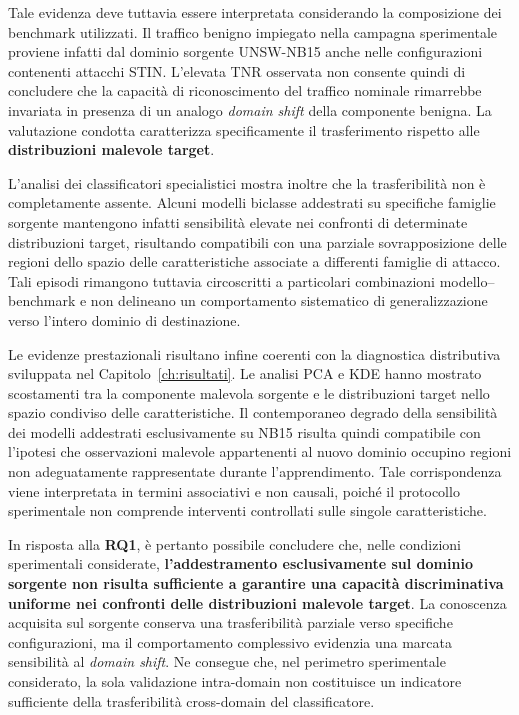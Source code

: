 Tale evidenza deve tuttavia essere interpretata considerando la composizione dei benchmark utilizzati.
Il traffico benigno impiegato nella campagna sperimentale proviene infatti dal dominio sorgente UNSW-NB15 anche nelle configurazioni contenenti attacchi STIN.
L'elevata TNR osservata non consente quindi di concludere che la capacità di riconoscimento del traffico nominale rimarrebbe invariata in presenza di un analogo \textit{domain shift} della componente benigna.
La valutazione condotta caratterizza specificamente il trasferimento rispetto alle \textbf{distribuzioni malevole target}.

L'analisi dei classificatori specialistici mostra inoltre che la trasferibilità non è completamente assente.
Alcuni modelli biclasse addestrati su specifiche famiglie sorgente mantengono infatti sensibilità elevate nei confronti di determinate distribuzioni target, risultando compatibili con una parziale sovrapposizione delle regioni dello spazio delle caratteristiche associate a differenti famiglie di attacco.
Tali episodi rimangono tuttavia circoscritti a particolari combinazioni modello--benchmark e non delineano un comportamento sistematico di generalizzazione verso l'intero dominio di destinazione.

Le evidenze prestazionali risultano infine coerenti con la diagnostica distributiva sviluppata nel Capitolo~\ref{ch:risultati}.
Le analisi PCA e KDE hanno mostrato scostamenti tra la componente malevola sorgente e le distribuzioni target nello spazio condiviso delle caratteristiche.
Il contemporaneo degrado della sensibilità dei modelli addestrati esclusivamente su NB15 risulta quindi compatibile con l'ipotesi che osservazioni malevole appartenenti al nuovo dominio occupino regioni non adeguatamente rappresentate durante l'apprendimento.
Tale corrispondenza viene interpretata in termini associativi e non causali, poiché il protocollo sperimentale non comprende interventi controllati sulle singole caratteristiche.

In risposta alla \textbf{RQ1}, è pertanto possibile concludere che, nelle condizioni sperimentali considerate, \textbf{l'addestramento esclusivamente sul dominio sorgente non risulta sufficiente a garantire una capacità discriminativa uniforme nei confronti delle distribuzioni malevole target}.
La conoscenza acquisita sul sorgente conserva una trasferibilità parziale verso specifiche configurazioni, ma il comportamento complessivo evidenzia una marcata sensibilità al \textit{domain shift}.
Ne consegue che, nel perimetro sperimentale considerato, la sola validazione intra-domain non costituisce un indicatore sufficiente della trasferibilità cross-domain del classificatore.


